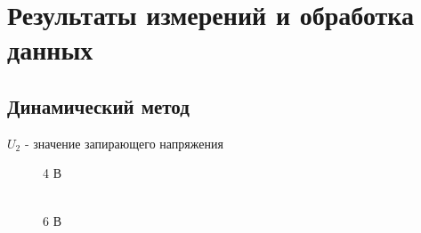 \documentclass[12pt,a4paper]{article}
\begin{document}
\section{Результаты измерений и обработка данных}

\subsection{Динамический метод}

$U_2$ - значение запирающего напряжения

\begin{figure}[H]
\begin{minipage}[h]{0.31\linewidth}
 4 В \\
\end{minipage}
\hfill
\begin{minipage}[h]{0.31\linewidth}
 \\ 6 В

\end{minipage}
\end{figure}
\end{document}
